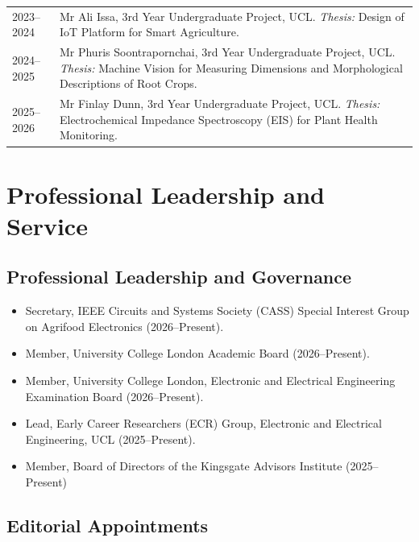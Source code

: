 \documentclass[a4paper,11pt]{article}
\newcommand{\cvitem}[2]{%
    \textsc{#1} & #2\\[2.5mm]
}
\begin{document}
\begin{tabularx}{\textwidth}{>{\raggedleft\arraybackslash}p{2.4cm} X}

\cvitem{2023--2024}{
Mr Ali Issa, 3rd Year Undergraduate Project, UCL.
\emph{Thesis:} Design of IoT Platform for Smart Agriculture.
}

\cvitem{2024--2025}{
Mr Phuris Soontrapornchai, 3rd Year Undergraduate Project, UCL.
\emph{Thesis:} Machine Vision for Measuring Dimensions and Morphological Descriptions of Root Crops.
}

\cvitem{2025--2026}{
Mr Finlay Dunn, 3rd Year Undergraduate Project, UCL.
\emph{Thesis:} Electrochemical Impedance Spectroscopy (EIS) for Plant Health Monitoring.
}

\end{tabularx}


\section{Professional Leadership and Service}

\subsection*{Professional Leadership and Governance}

\begin{itemize}
    \item Secretary, IEEE Circuits and Systems Society (CASS) Special Interest Group on Agrifood Electronics (2026--Present).
    \item Member, University College London Academic Board (2026--Present).
    \item Member, University College London, Electronic and Electrical Engineering Examination Board (2026--Present).
    \item Lead, Early Career Researchers (ECR) Group, Electronic and Electrical Engineering, UCL (2025--Present).
    \item Member, Board of Directors of the Kingsgate Advisors Institute (2025--Present)
\end{itemize}

\subsection*{Editorial Appointments}
\end{document}
